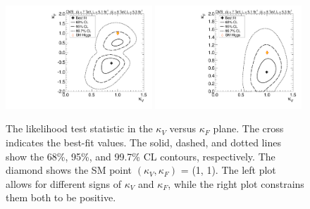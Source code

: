 \documentclass[12pt,twoside,a4paper,cmspaper,final,collab]{cms-tdr}
\begin{document}
\begin{figure}
\centering
\includegraphics[width=0.49\textwidth]{figures/comb/sqr_cvcf_scan_2d_comb_HPA_smallGGScale} \hfill
\includegraphics[width=0.49\textwidth]{figures/comb/sqr_cvcf_cut_scan_2d_comb_HPA_smallGGScale}
\caption{
The likelihood test statistic in the  $\kappa_V$ versus $\kappa_F$ plane.
The cross indicates the best-fit values. The solid, dashed, and dotted lines  show the
68\%, 95\%,  and 99.7\% CL contours, respectively.
The diamond shows the SM point
$(\kappa_V, \kappa_F)$ = (1, 1). The left plot allows for different signs of $\kappa_V$ and $\kappa_F$, while the
right plot constrains them both to be positive.
}
\label{fig:cVcF_2D}
\end{figure}
\end{document}
